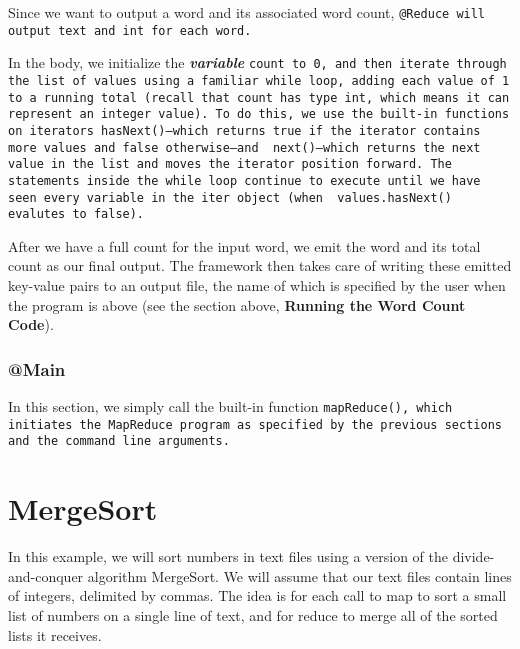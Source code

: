 \documentclass{article} \usepackage{fancyhdr, multicol}
\begin{document}
Since we want to output a word and its associated word count, \tt @Reduce \rm will
output \tt text \rm and \tt int \rm for each word.

In the body, we initialize the \textbf{\emph{variable}} \tt count \rm to \tt 0\rm,
and then iterate through the list of values using a familiar \tt while \rm loop,
adding each value of \tt 1 \rm to a running total (recall that \tt count \rm has
type \tt int\rm, which means it can represent an integer value). To do this, we use
the built-in functions on iterators \tt hasNext()\rm---which returns \tt true \rm
if the iterator contains more values and \tt false \rm otherwise---and \tt
next()\rm---which returns the next value in the \tt list \rm and moves the
iterator position forward. The statements inside the \tt while \rm loop continue to
execute until we have seen every variable in the \tt iter \rm object (when \tt
values.hasNext() \rm evalutes to \tt false\rm).

After we have a full count for the input word, we emit the word and its total count
as our final output. The framework then takes care of writing these emitted
key-value pairs to an output file, the name of which is specified by the user when
the program is above (see the section above, \textbf{Running the Word Count Code}).

\subsubsection*{@Main}

In this section, we simply call the built-in function \tt mapReduce()\rm, which
initiates the MapReduce program as specified by the previous sections and the
command line arguments.


\section*{MergeSort} \label{merge_sort} 

In this example, we will sort numbers in text files using a version of the
divide-and-conquer algorithm MergeSort. We will assume that our text files contain
lines of integers, delimited by commas. The idea is for each call to map to sort a
small list of numbers on a single line of text, and for reduce to merge all of the
sorted lists it receives.
\end{document}
